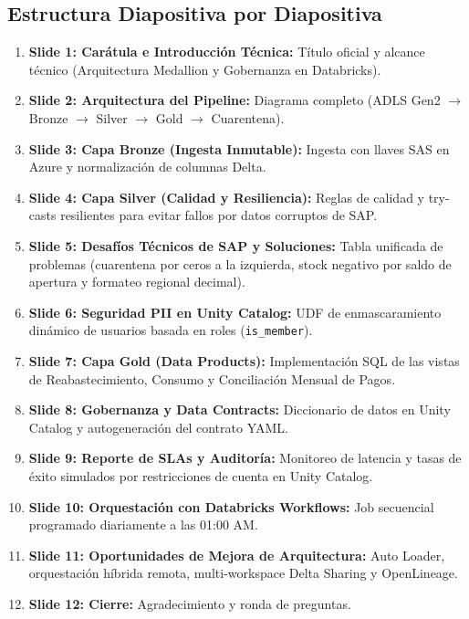 \documentclass[11pt,a4paper]{article}
\begin{document}
\subsection{Estructura Diapositiva por Diapositiva}
\begin{enumerate}
    \item \textbf{Slide 1: Carátula e Introducción Técnica:} Título oficial y alcance técnico (Arquitectura Medallion y Gobernanza en Databricks).
    \item \textbf{Slide 2: Arquitectura del Pipeline:} Diagrama completo (ADLS Gen2 $\rightarrow$ Bronze $\rightarrow$ Silver $\rightarrow$ Gold $\rightarrow$ Cuarentena).
    \item \textbf{Slide 3: Capa Bronze (Ingesta Inmutable):} Ingesta con llaves SAS en Azure y normalización de columnas Delta.
    \item \textbf{Slide 4: Capa Silver (Calidad y Resiliencia):} Reglas de calidad y try-casts resilientes para evitar fallos por datos corruptos de SAP.
    \item \textbf{Slide 5: Desafíos Técnicos de SAP y Soluciones:} Tabla unificada de problemas (cuarentena por ceros a la izquierda, stock negativo por saldo de apertura y formateo regional decimal).
    \item \textbf{Slide 6: Seguridad PII en Unity Catalog:} UDF de enmascaramiento dinámico de usuarios basada en roles (\texttt{is\_member}).
    \item \textbf{Slide 7: Capa Gold (Data Products):} Implementación SQL de las vistas de Reabastecimiento, Consumo y Conciliación Mensual de Pagos.
    \item \textbf{Slide 8: Gobernanza y Data Contracts:} Diccionario de datos en Unity Catalog y autogeneración del contrato YAML.
    \item \textbf{Slide 9: Reporte de SLAs y Auditoría:} Monitoreo de latencia y tasas de éxito simulados por restricciones de cuenta en Unity Catalog.
    \item \textbf{Slide 10: Orquestación con Databricks Workflows:} Job secuencial programado diariamente a las 01:00 AM.
    \item \textbf{Slide 11: Oportunidades de Mejora de Arquitectura:} Auto Loader, orquestación híbrida remota, multi-workspace Delta Sharing y OpenLineage.
    \item \textbf{Slide 12: Cierre:} Agradecimiento y ronda de preguntas.
\end{enumerate}
\end{document}
